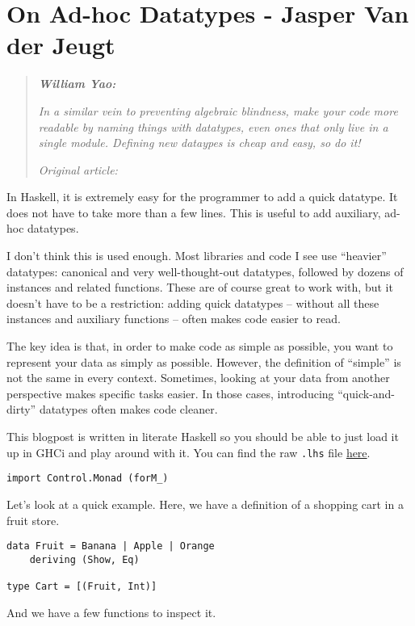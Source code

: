 \chapter{On Ad-hoc Datatypes - Jasper Van der Jeugt}

\begin{quotation}
\noindent\textit{\textbf{William Yao:}}

\textit{In a similar vein to preventing algebraic blindness, make your code more readable by naming things with datatypes, even ones that only live in a single module. Defining new dataypes is cheap and easy, so do it!}

\vspace{\baselineskip}
\noindent\textit{Original article: \cite{on_adhoc_datatypes}}
\end{quotation}
In Haskell, it is extremely easy for the programmer to add a quick datatype. It does not have to take more than a few lines. This is useful to add auxiliary, ad-hoc datatypes.

I don't think this is used enough. Most libraries and code I see use ``heavier'' datatypes: canonical and very well-thought-out datatypes, followed by dozens of instances and related functions. These are of course great to work with, but it doesn't have to be a restriction: adding quick datatypes -- without all these instances and auxiliary functions -- often makes code easier to read.

The key idea is that, in order to make code as simple as possible, you want to represent your data as simply as possible. However, the definition of ``simple'' is not the same in every context. Sometimes, looking at your data from another perspective makes specific tasks easier. In those cases, introducing ``quick-and-dirty'' datatypes often makes code cleaner.

This blogpost is written in literate Haskell so you should be able to just load it up in GHCi and play around with it. You can find the raw \texttt{.lhs} file \href{https://github.com/jaspervdj/jaspervdj/raw/master/posts/2016-05-11-ad-hoc-datatypes.lhs}{here}.

\begin{verbatim}
import Control.Monad (forM_)
\end{verbatim}
Let's look at a quick example. Here, we have a definition of a shopping cart in a fruit store.

\begin{verbatim}
data Fruit = Banana | Apple | Orange
    deriving (Show, Eq)

type Cart = [(Fruit, Int)]
\end{verbatim}
And we have a few functions to inspect it.

